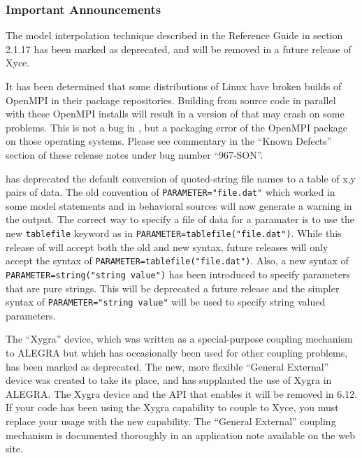\documentclass[letterpaper]{scrartcl}
\begin{document}
\subsubsection*{Important Announcements}
\begin{XyceItemize}
\item The model interpolation technique described in the \Xyce{}
  Reference Guide in section 2.1.17 has been marked as deprecated, and
  will be removed in a future release of Xyce.
\item It has been determined that some distributions of Linux have
  broken builds of OpenMPI in their package repositories.  Building
  \Xyce{} from source code in parallel with these OpenMPI installs
  will result in a version of \Xyce{} that may crash on some problems.
  This is not a bug in \Xyce{}, but a packaging error of the OpenMPI
  package on those operating systems.  Please see commentary in the
  ``Known Defects'' section of these release notes under bug number
  ``967-SON''.
\item \Xyce{} has deprecated the default conversion of quoted-string file
  names to a table of x,y pairs of data.  The old convention of
  \texttt{PARAMETER="file.dat"} which worked in some model statements
  and in behavioral sources will now generate a warning in the \Xyce{}
  output.  The correct way to specify a file of data for a paramater
  is to use the new \texttt{tablefile} keyword as in
  \texttt{PARAMETER=tablefile("file.dat")}.  While this release of
  \Xyce{} will accept both the old and new syntax, future releases
  will only accept the syntax of
  \texttt{PARAMETER=tablefile("file.dat")}.  Also, a new
  syntax of \texttt{PARAMETER=string("string value")} has been
  introduced to specify parameters that are pure strings.  This will
  be deprecated a future release and the simpler syntax of
  \texttt{PARAMETER="string value"} will be used to specify string
  valued parameters.
\item The ``Xygra'' device, which was written as a special-purpose
  coupling mechanism to ALEGRA but which has occasionally been used
  for other coupling problems, has been marked as deprecated.  The
  new, more flexible ``General External'' device was created to take
  its place, and has supplanted the use of Xygra in ALEGRA.  The Xygra
  device and the API that enables it will be removed in \Xyce{} 6.12.
  If your code has been using the Xygra capability to couple to Xyce,
  you must replace your usage with the new capability.  The ``General
  External'' coupling mechanism is documented thoroughly in an
  application note available on the \Xyce{} web site.
\end{XyceItemize}
\end{document}
